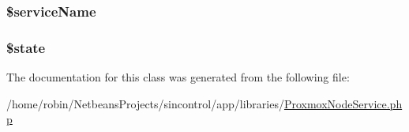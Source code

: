 \subsubsection[{\$service\+Name}]{\setlength{\rightskip}{0pt plus 5cm}\$service\+Name\hspace{0.3cm}{\ttfamily [private]}}\label{class_proxmox_node_service_a97c69a9ed13f64b5b324f42ae134399c}
\hypertarget{class_proxmox_node_service_ae82306c4f2d17d8dd5c7d8d916b33bed}{}
\subsubsection[{\$state}]{\setlength{\rightskip}{0pt plus 5cm}\$state\hspace{0.3cm}{\ttfamily [private]}}\label{class_proxmox_node_service_ae82306c4f2d17d8dd5c7d8d916b33bed}


The documentation for this class was generated from the following file\+:\begin{DoxyCompactItemize}
\item 
/home/robin/\+Netbeans\+Projects/sincontrol/app/libraries/\hyperlink{_proxmox_node_service_8php}{Proxmox\+Node\+Service.\+php}\end{DoxyCompactItemize}
